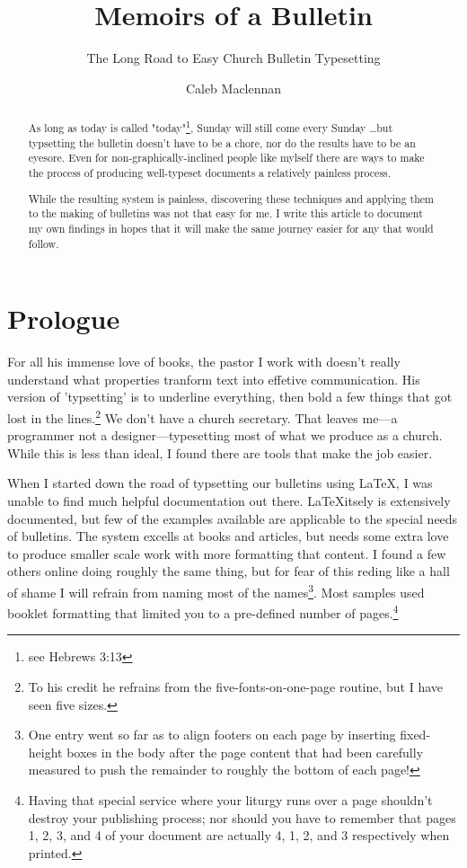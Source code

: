 \documentclass[11pt]{scrartcl} %
\begin{document}
\title{Memoirs of a Bulletin}
\subtitle{The Long Road to Easy Church Bulletin Typesetting}
\author{Caleb Maclennan}

\maketitle

\begin{abstract}
As long as today is called "today"\footnote{see Hebrews 3:13}, Sunday will still come every Sunday \dots but typsetting the bulletin doesn't have to be a chore, nor do the results have to be an eyesore. Even for non-graphically-inclined people like mylself there are ways to make the process of producing well-typeset documents a relatively painless process.

While the resulting system is painless, discovering these techniques and applying them to the making of bulletins was not that easy for me. I write this article to document my own findings in hopes that it will make the same journey easier for any that would follow.
\end{abstract}

\thispagestyle{empty}

\section*{Prologue}

For all his immense love of books, the pastor I work with doesn't really understand what properties tranform text into effetive communication. His version of 'typsetting' is to underline everything, then bold a few things that got lost in the lines.\footnote{To his credit he refrains from the five-fonts-on-one-page routine, but I have seen five sizes.} We don't have a church secretary. That leaves me---a programmer not a designer---typesetting most of what we produce as a church. While this is less than ideal, I found there are tools that make the job easier.

When I started down the road of typsetting our bulletins using \LaTeX, I was unable to find much helpful documentation out there. \LaTeX itsely is extensively documented, but few of the examples available are applicable to the special needs of bulletins. The system excells at books and articles, but needs some extra love to produce smaller scale work with more formatting that content. I found a few others online doing roughly the same thing, but for fear of this reding like a hall of shame I will refrain from naming most of the names\footnote{One entry went so far as to align footers on each page by inserting fixed-height boxes in the body after the page content that had been carefully measured to push the remainder to roughly the bottom of each page!}. Most samples used booklet formatting that limited you to a pre-defined number of pages.\footnote{Having that special service where your liturgy runs over a page shouldn't destroy your publishing process; nor should you have to remember that pages 1, 2, 3, and 4 of your document are actually 4, 1, 2, and 3 respectively when printed.}
\end{document}
